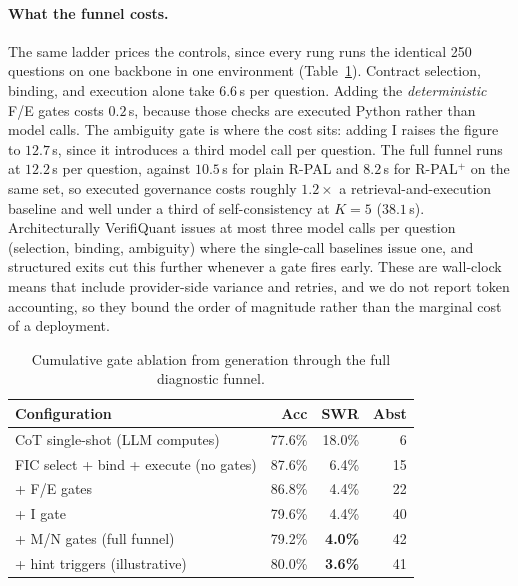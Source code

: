 \documentclass[sigconf,anonymous]{acmart}
\begin{document}
\paragraph{What the funnel costs.}
The same ladder prices the controls, since every rung runs the identical 250 questions on one backbone in one environment (Table~\ref{tab:v2gateladder}).
Contract selection, binding, and execution alone take $6.6$\,s per question. Adding the \emph{deterministic} F/E gates costs $0.2$\,s, because those checks are executed Python rather than model calls. The ambiguity gate is where the cost sits: adding I raises the figure to $12.7$\,s, since it introduces a third model call per question. The full funnel runs at $12.2$\,s per question, against $10.5$\,s for plain R-PAL and $8.2$\,s for R-PAL$^{+}$ on the same set, so executed governance costs roughly $1.2\times$ a retrieval-and-execution baseline and well under a third of self-consistency at $K{=}5$ ($38.1$\,s). Architecturally VerifiQuant issues at most three model calls per question (selection, binding, ambiguity) where the single-call baselines issue one, and structured exits cut this further whenever a gate fires early.
These are wall-clock means that include provider-side variance and retries, and we do not report token accounting, so they bound the order of magnitude rather than the marginal cost of a deployment.

\begin{table}[t]
\caption{Cumulative gate ablation from generation through the full diagnostic funnel.}
\label{tab:v2gateladder}
\small
\begin{tabular}{@{}lrrr@{}}
\toprule
Configuration & Acc & SWR & Abst \\
\midrule
CoT single-shot (LLM computes) & 77.6\% & 18.0\% & 6 \\
FIC select + bind + execute (no gates) & 87.6\% & 6.4\% & 15 \\
\quad + F/E gates & 86.8\% & 4.4\% & 22 \\
\quad + I gate & 79.6\% & 4.4\% & 40 \\
\quad + M/N gates (full funnel) & 79.2\% & \textbf{4.0\%} & 42 \\
\quad + hint triggers (illustrative) & 80.0\% & \textbf{3.6\%} & 41 \\
\bottomrule
\end{tabular}
\end{table}

\end{document}
